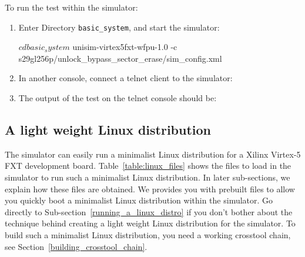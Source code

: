 \noindent To run the test within the simulator:
\begin{enumerate}
\item Enter Directory \texttt{basic\_system}, and start the simulator:
\begin{script}
$ cd basic_system
$ unisim-virtex5fxt-wfpu-1.0 -c s29gl256p/unlock_bypass_sector_erase/sim_config.xml
\end{script}
\item In another console, connect a telnet client to the simulator:
\item The output of the test on the telnet console should be:

\end{enumerate}

\subsection{A light weight Linux distribution}

The simulator can easily run a minimalist Linux distribution for a Xilinx Virtex-5 FXT development board.
Table~\ref{table:linux_files} shows the files to load in the simulator to run such a minimalist Linux distribution.
In later sub-sections, we explain how these files are obtained.
We provides you with prebuilt files to allow you quickly boot a minimalist Linux distribution within the simulator.
Go directly to Sub-section~\ref{running_a_linux_distro} if you don't bother about the technique behind creating a light weight Linux distribution for the simulator.
To build such a minimalist Linux distribution, you need a working crosstool chain, see Section~\ref{building_crosstool_chain}.

